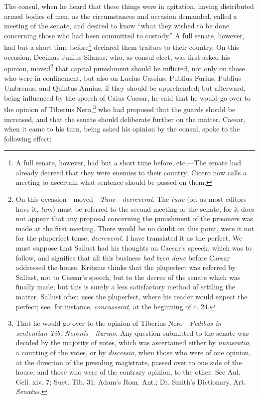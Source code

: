 The consul, when he heard that these things were in agitation, having
distributed armed bodies of men, as the circumstances and occasion
demanded, called a meeting of the senate, and desired to know ``what
they wished to be done concerning those who had been committed to
custody.'' A full senate, however, had but a short time before\footnote{A full senate, however, had but a short time before,
etc.—The senate had already decreed that they were enemies to their
country; Cicero now calls a meeting to ascertain what sentence should
be passed on them.}
declared them traitors to their country. On this occasion, Decimus
Junius Silanus, who, as consul elect, was first asked his opinion,
moved\footnote{On this occasion—moved—\emph{Tunc—decreverat}. The \emph{tunc}
(or, as most editors have it, \emph{tum}) must be referred to the second
meeting or the senate, for it does not appear that any proposal
concerning the punishment of the prisoners was made at the first
meeting. There would be no doubt on this point, were it not for the
pluperfect tense, \emph{decreverat}. I have translated it as the perfect.
We must suppose that Sallust had his thoughts on Caesar's speech,
which was to follow, and signifies that all this business \emph{had been
done} before Caesar addressed the house. Kritzius thinks that the
pluperfect was referred by Sallust, not to Caesar's speech, but to the
decree of the senate which was finally made; but this is surely a less
satisfactory method of settling the matter. Sallust often uses the
pluperfect, where his reader would expect the perfect; see, for
instance, \emph{concusserat}, at the beginning of c. 24.} that capital punishment should be inflicted, not only on
those who were in confinement, but also on Lucius Cassius, Publius
Furius, Publius Umbrenus, and Quintus Annius, if they should be
apprehended; but afterward, being influenced by the speech of Caius
Caesar, he said that he would go over to the opinion of Tiberius
Nero,\footnote{That he would go over to the opinion of Tiberius Nero—\emph{Pedibus
in sententian Tib. Neronis—iturum}. Any question submitted to the
senate was decided by the majority of votes, which was ascertained
either by \emph{numeratio}, a counting of the votes, or by \emph{discessio},
when those who were of one opinion, at the direction of the presiding
magistrate, passed over to one side of the house, and those who were
of the contrary opinion, to the other. See Aul. Gell. xiv. 7; Suet.
Tib. 31; Adam's Rom. Ant.; Dr. Smith's Dictionary, Art. \emph{Senatus}.} who had proposed that the guards should be increased, and
that the senate should deliberate further on the matter. Caesar, when
it came to his turn, being asked his opinion by the consul, spoke to
the following effect:

